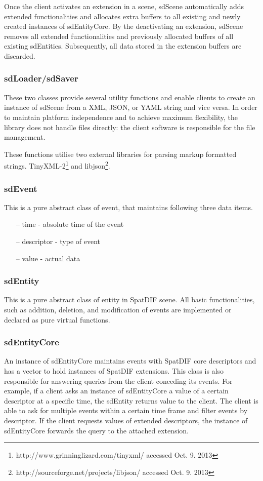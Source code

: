 \documentclass[a4paper]{article}
\begin{document}
Once the client activates an extension in a scene, sdScene automatically adds extended functionalities and allocates extra buffers to all existing and newly created instances of sdEntityCore. 
By the deactivating an extension, sdScene removes all extended functionalities and previously allocated buffers of all existing sdEntities. 
Subsequently, all data stored in the extension buffers are discarded.

\subsubsection{sdLoader/sdSaver}
These two classes provide several utility functions and enable clients to create an instance of sdScene from a XML, JSON, or YAML string and vice versa. 
In order to maintain platform independence and to achieve maximum flexibility, the library does not handle files directly: the client software is responsible for the file management. 

These functions utilise two external libraries for parsing markup formatted strings. TinyXML-2\footnote{http://www.grinninglizard.com/tinyxml/ accessed Oct. 9. 2013} and libjson\footnote{http://sourceforge.net/projects/libjson/ accessed Oct. 9. 2013}.

\subsubsection{sdEvent}
This is a pure abstract class of event, that maintains following three data items.

\begin{itemize}[leftmargin=*]
\item[--] time - absolute time of the event
\item[--] descriptor - type of event
\item[--] value - actual data
\end{itemize}

\subsubsection{sdEntity}
This is a pure abstract class of entity in SpatDIF scene. All basic functionalities, such as addition, deletion, and modification of events are implemented or declared as pure virtual functions.

\subsubsection{sdEntityCore}
An instance of sdEntityCore maintains events with SpatDIF core descriptors and has a vector to hold instances of SpatDIF extensions. 
This class is also responsible for answering queries from the client conceding its events. For example, if a client asks an instance of sdEntityCore a value of a certain descriptor at a specific time, the sdEntity returns value to the client. 
The client is able to ask for multiple events within a certain time frame and filter events by descriptor. If the client requests values of extended descriptors, the instance of sdEntityCore forwards the query to the attached extension.
\end{document}
